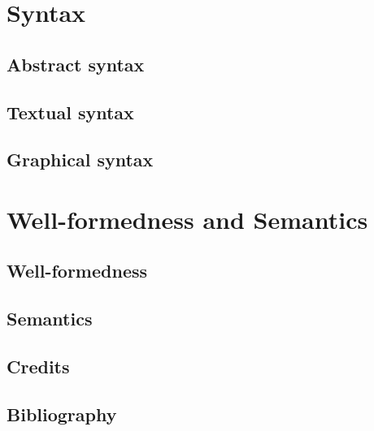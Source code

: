 \documentclass[11pt]{book}
\begin{document}
\part{Syntax}

\chapter{Abstract syntax}\label{cha:metamodel}


\chapter{Textual syntax}\label{cha:textual}


\chapter{Graphical syntax}\label{cha:graphical}


\part{Well-formedness and Semantics}

\chapter{Well-formedness}\label{cha:wf}


\chapter{Semantics}\label{cha:semantics}


\appendix

\stopcontents

\chapter*{Credits}\label{cha:credits}


\chapter*{Bibliography}
\printbibliography[heading=bibempty]
\end{document}
